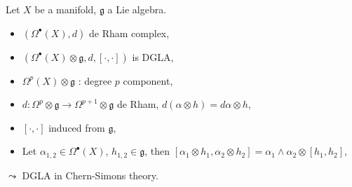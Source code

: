 \documentclass[10pt]{article}
\begin{document}
\begin{example}[de-Rham + Lie = DGLA]
  Let $X$ be a manifold, $\mathfrak{g}$ a Lie algebra.
  \begin{itemize}
    \item $(\Omega^{\bullet}(X), d)$ de Rham complex,
    \item $(\Omega^{\bullet}(X) \otimes \mathfrak{g}, d, [\cdot,\cdot])$ is DGLA,
    \item $\Omega^p(X) \otimes \mathfrak{g}$ : degree $p$ component,
    \item $d: \Omega^p \otimes \mathfrak{g} \to \Omega^{p+1} \otimes \mathfrak{g}$ de Rham, $d(\alpha \otimes h) = d\alpha \otimes h$,
    \item $[\cdot,\cdot]$ induced from $\mathfrak{g}$,
    \item Let $ \alpha_{1,2} \in \Omega^{\bullet}(X)$, $ h_{1,2} \in \mathfrak{g}$, then $[\alpha_1 \otimes h_1, \alpha_2 \otimes h_2] = \alpha_1 \wedge \alpha_2 \otimes [h_1, h_2]$,
  \end{itemize}
  $\leadsto$ DGLA in Chern-Simons theory.
\end{example}
\end{document}
